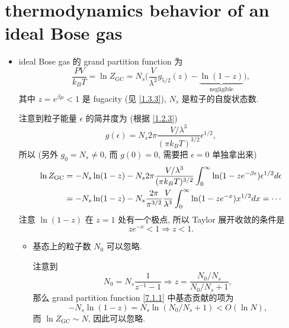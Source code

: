 \section{thermodynamics behavior of an ideal Bose gas}
\begin{itemize}
	\item ideal Bose gas 的 grand partition function 为
	\begin{equation} \label{7.1.1}
		\frac{P V}{k_B T} = \ln Z_\text{GC} = N_s \Big( \frac{V}{\lambda^3} g_{5 / 2}(z) - \underbrace{\ln(1 - z)}_{\text{negligible}} \Big),
	\end{equation}
	其中 $z = e^{\beta \mu} < 1$ 是 fugacity (见 \eqref{1.3.3}), $N_s$ 是粒子的自旋状态数.
	
	\begin{tcolorbox}[title=calculation:]
		注意到粒子能量 $\epsilon$ 的简并度为 (根据 \eqref{1.2.3})
		\begin{equation}
			g(\epsilon) = N_s 2 \pi \frac{V / \lambda^3}{(\pi k_B T)^{3 / 2}} \epsilon^{1 / 2},
		\end{equation}
		所以 (另外 $g_0 = N_s \neq 0$, 而 $g(0) = 0$, 需要把 $\epsilon = 0$ 单独拿出来)
		\begin{align}
			\ln Z_\text{GC} &= - N_s \ln(1 - z) - N_s 2 \pi \frac{V / \lambda^3}{(\pi k_B T)^{3 / 2}} \int_0^\infty \ln(1 - z e^{- \beta \epsilon}) \epsilon^{1 / 2} d\epsilon \notag \\
			&= - N_s \ln(1 - z) - N_s \frac{2 \pi}{\pi^{3 / 2}} \frac{V}{\lambda^3} \int_0^\infty \ln(1 - z e^{- x}) x^{1 / 2} dx = \cdots
		\end{align}
		注意 $\ln(1 - z)$ 在 $z = 1$ 处有一个极点, 所以 Taylor 展开收敛的条件是
		\begin{equation} \label{7.1.4}
			z e^{- x} < 1 \Longrightarrow z < 1.
		\end{equation}
	\end{tcolorbox}
	
	\begin{itemize}
		\item 基态上的粒子数 $N_0$ 可以忽略.
		
		\begin{tcolorbox}[title=proof:]
			注意到
			\begin{equation}
				N_0 = N_s \frac{1}{z^{- 1} - 1} \Longrightarrow z = \frac{N_0 / N_s}{N_0 / N_s + 1},
			\end{equation}
			那么 grand partition function \eqref{7.1.1} 中基态贡献的项为
			\begin{equation}
				- N_s \ln(1 - z) = N_s \ln(N_0 / N_s + 1) < O(\ln N),
			\end{equation}
			而 $\ln Z_\text{GC} \sim N$, 因此可以忽略.
		\end{tcolorbox}
	\end{itemize}
	

\end{itemize}
